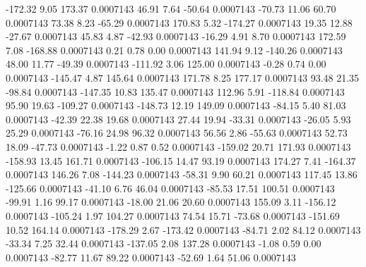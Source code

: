      -172.32        9.05      173.37     0.0007143
       46.91        7.64      -50.64     0.0007143
      -70.73       11.06       60.70     0.0007143
       73.38        8.23      -65.29     0.0007143
      170.83        5.32     -174.27     0.0007143
       19.35       12.88      -27.67     0.0007143
       45.83        4.87      -42.93     0.0007143
      -16.29        4.91        8.70     0.0007143
      172.59        7.08     -168.88     0.0007143
        0.21        0.78        0.00     0.0007143
      141.94        9.12     -140.26     0.0007143
       48.00       11.77      -49.39     0.0007143
     -111.92        3.06      125.00     0.0007143
       -0.28        0.74        0.00     0.0007143
     -145.47        4.87      145.64     0.0007143
      171.78        8.25      177.17     0.0007143
       93.48       21.35      -98.84     0.0007143
     -147.35       10.83      135.47     0.0007143
      112.96        5.91     -118.84     0.0007143
       95.90       19.63     -109.27     0.0007143
     -148.73       12.19      149.09     0.0007143
      -84.15        5.40       81.03     0.0007143
      -42.39       22.38       19.68     0.0007143
       27.44       19.94      -33.31     0.0007143
      -26.05        5.93       25.29     0.0007143
      -76.16       24.98       96.32     0.0007143
       56.56        2.86      -55.63     0.0007143
       52.73       18.09      -47.73     0.0007143
       -1.22        0.87        0.52     0.0007143
     -159.02       20.71      171.93     0.0007143
     -158.93       13.45      161.71     0.0007143
     -106.15       14.47       93.19     0.0007143
      174.27        7.41     -164.37     0.0007143
      146.26        7.08     -144.23     0.0007143
      -58.31        9.90       60.21     0.0007143
      117.45       13.86     -125.66     0.0007143
      -41.10        6.76       46.04     0.0007143
      -85.53       17.51      100.51     0.0007143
      -99.91        1.16       99.17     0.0007143
      -18.00       21.06       20.60     0.0007143
      155.09        3.11     -156.12     0.0007143
     -105.24        1.97      104.27     0.0007143
       74.54       15.71      -73.68     0.0007143
     -151.69       10.52      164.14     0.0007143
     -178.29        2.67     -173.42     0.0007143
      -84.71        2.02       84.12     0.0007143
      -33.34        7.25       32.44     0.0007143
     -137.05        2.08      137.28     0.0007143
       -1.08        0.59        0.00     0.0007143
      -82.77       11.67       89.22     0.0007143
      -52.69        1.64       51.06     0.0007143
